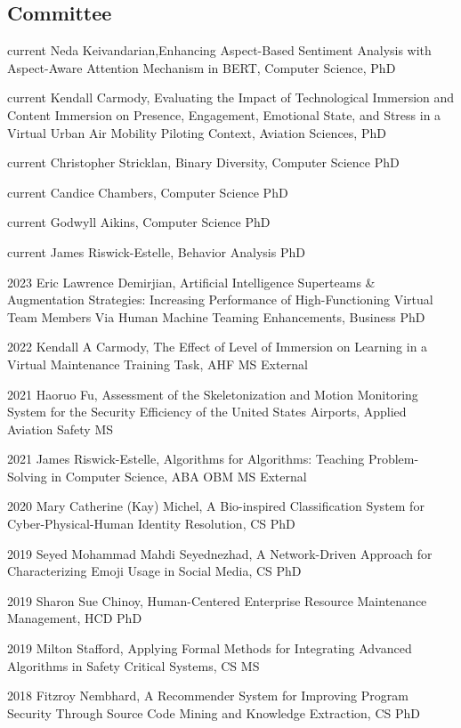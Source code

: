 \documentclass[12pt,letterpaper]{report}
\newcommand{\listitemspace}{0.25em}
\renewenvironment{itemize}
{\begin{list}{}{\setlength{\leftmargin}{0em}
                \setlength{\parskip}{0em}
                \setlength{\itemsep}{\listitemspace}
                \setlength{\parsep}{\listitemspace}}}
{\end{list}}
\begin{document}
    \subsection*{Committee}
    \begin{itemize}
    \item current Neda Keivandarian,Enhancing Aspect-Based Sentiment Analysis with Aspect-Aware Attention Mechanism in BERT, Computer Science, PhD
    \item current Kendall Carmody, Evaluating the Impact of Technological Immersion and Content Immersion on Presence, Engagement, Emotional State, and Stress in a Virtual Urban Air Mobility Piloting Context, Aviation Sciences, PhD
    \item current Christopher Stricklan, Binary Diversity, Computer Science PhD
    \item current Candice Chambers, Computer Science PhD
    \item current Godwyll Aikins, Computer Science PhD
    \item current James Riswick-Estelle, Behavior Analysis PhD
    \item  2023 Eric Lawrence Demirjian, Artificial Intelligence Superteams \& Augmentation Strategies: Increasing Performance of High-Functioning Virtual Team Members Via Human Machine Teaming Enhancements, Business PhD
    \item 2022 Kendall A Carmody, The Effect of Level of Immersion on Learning in a Virtual Maintenance Training Task, AHF MS External
    \item 2021 Haoruo Fu, Assessment of the Skeletonization and Motion Monitoring System for the Security Efficiency of the United States Airports, Applied Aviation Safety MS
    \item 2021 James Riswick-Estelle, Algorithms for Algorithms: Teaching Problem-Solving in Computer Science, ABA OBM MS External
    \item 2020 Mary Catherine (Kay) Michel, A Bio-inspired Classification System for Cyber-Physical-Human Identity Resolution, CS PhD
    \item 2019 Seyed Mohammad Mahdi Seyednezhad, A Network-Driven Approach for Characterizing Emoji Usage in Social Media, CS PhD
    \item 2019 Sharon Sue Chinoy, Human-Centered Enterprise Resource Maintenance Management, HCD PhD
    \item 2019 Milton Stafford, Applying Formal Methods for Integrating Advanced Algorithms in Safety Critical Systems, CS MS
    \item 2018 Fitzroy Nembhard, A Recommender System for Improving Program Security Through Source Code Mining and Knowledge Extraction, CS PhD

\end{itemize}
\end{document}

